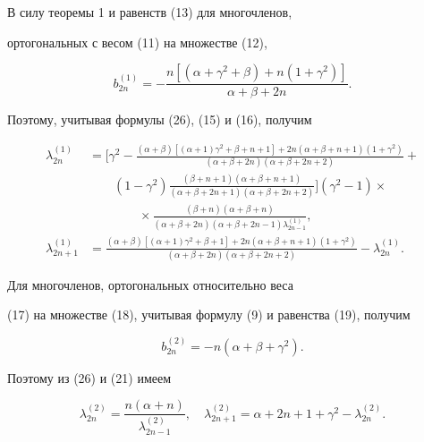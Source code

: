  


\begin{exam} 


В силу теоремы 1 и равенств (13) для многочленов, 


ортогональных с весом (11) на множестве (12), 


$$ 


b^{(1)}_{2n}=-\frac{n[(\alpha+\gamma^2+\beta)+ 


n(1+\gamma^2)]}{\alpha+\beta+2n}. 


$$ 


Поэтому, учитывая формулы (26), (15) и (16), получим 


\begin{align*} 


\lambda^{(1)}_{2n}&=\bigg[\gamma^2-


\frac{(\alpha+\beta)[(\alpha+1)\gamma^2+\beta+n+1]+ 


2n(\alpha+\beta+n+1)(1+\gamma^2)} 


{(\alpha+\beta+2n)(\alpha+\beta+2n+2)}+ \\ 


&\qquad (1-\gamma^2)\frac{(\beta+n+1)(\alpha+\beta+n+1)} 


{(\alpha+\beta+2n+1)(\alpha+\beta+2n+2)}\bigg](\gamma^2-1)\times\\ 


&\qquad\qquad\times\frac{(\beta+n)(\alpha+\beta+n)} 


{(\alpha+\beta+2n)(\alpha+\beta+2n-1)\lambda^{(1)}_{2n-1}},\\ 


\lambda^{(1)}_{2n+1}&=\frac{(\alpha+\beta)[(\alpha+1)\gamma^2+ 


\beta+1]+2n(\alpha+\beta+n+1)(1+\gamma^2)} 


{(\alpha+\beta+2n)(\alpha+\beta+2n+2)}-\lambda^{(1)}_{2n}. 


\end{align*} 


\end{exam} 


 


\begin{exam} 


Для многочленов, ортогональных относительно веса 


(17) на множестве (18), учитывая формулу (9) и равенства (19), получим 


$$ 


b^{(2)}_{2n}=-n(\alpha+\beta+\gamma^2). 


$$ 


Поэтому из (26) и (21) имеем 


$$ 


\lambda^{(2)}_{2n}=\frac{n(\alpha+n)}{\lambda^{(2)}_{2n-1}},\quad 


\lambda^{(2)}_{2n+1}=\alpha+2n+1+\gamma^2-\lambda^{(2)}_{2n}. 


$$ 


\end{exam} 


